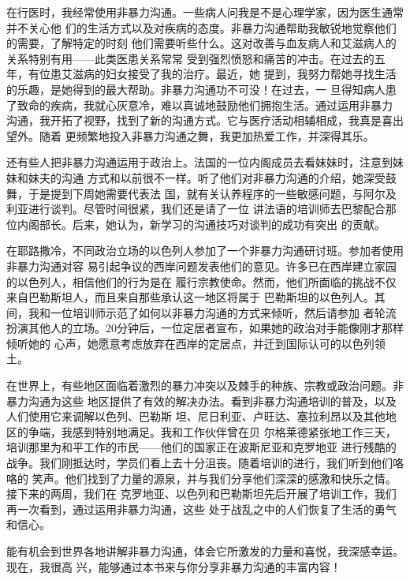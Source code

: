 \documentclass{ctexart}
\renewenvironment{quotation}{\setlength{\parskip}{0.5em}\setstretch{1.5}\kaishu\zihao{-5}\setlength{\parindent}{1em}}{\vspace{1em}}
\newcommand{\person}[1]{%
\nopagebreak{\raggedleft\small ------#1\par}}
\begin{document}
\begin{quotation}
	在行医时，我经常使用非暴力沟通。一些病人问我是不是心理学家，因为医生通常并不关心他
	们的生活方式以及对疾病的态度。非暴力沟通帮助我敏锐地觉察他们的需要，了解特定的时刻
	他们需要听些什么。这对改善与血友病人和艾滋病人的关系特别有用------此类医患关系常常
	受到强烈愤怒和痛苦的冲击。在过去的五年，有位患艾滋病的妇女接受了我的治疗。最近，她
	提到，我努力帮她寻找生活的乐趣，是她得到的最大帮助。非暴力沟通功不可没！在过去，一
	旦得知病人患了致命的疾病，我就心灰意冷，难以真诚地鼓励他们拥抱生活。通过运用非暴力
	沟通，我开拓了视野，找到了新的沟通方式。它与医疗活动相辅相成，我真是喜出望外。随着
	更频繁地投入非暴力沟通之舞，我更加热爱工作，并深得其乐。

	\person{------巴黎的一位医生}
\end{quotation}

还有些人把非暴力沟通运用于政治上。法国的一位内阁成员去看妹妹时，注意到妹妹和妹夫的沟通
方式和以前很不一样。听了他们对非暴力沟通的介绍，她深受鼓舞，于是提到下周她需要代表法
国，就有关认养程序的一些敏感问题，与阿尔及利亚进行谈判。尽管时间很紧，我们还是请了一位
讲法语的培训师去巴黎配合那位内阁部长。后来，她认为，新学习的沟通技巧对谈判的成功有突出
的贡献。

在耶路撒冷，不同政治立场的以色列人参加了一个非暴力沟通研讨班。参加者使用非暴力沟通对容
易引起争议的西岸问题发表他们的意见。许多已在西岸建立家园的以色列人，相信他们的行为是在
履行宗教使命。然而，他们所面临的挑战不仅来自巴勒斯坦人，而且来自那些承认这一地区将属于
巴勒斯坦的以色列人。其间，我和一位培训师示范了如何以非暴力沟通的方式来倾听，然后请参加
者轮流扮演其他人的立场。20分钟后，一位定居者宣布，如果她的政治对手能像刚才那样倾听她的
心声，她愿意考虑放弃在西岸的定居点，并迁到国际认可的以色列领土。

在世界上，有些地区面临着激烈的暴力冲突以及棘手的种族、宗教或政治问题。非暴力沟通为这些
地区提供了有效的解决办法。看到非暴力沟通培训的普及，以及人们使用它来调解以色列、巴勒斯
坦、尼日利亚、卢旺达、塞拉利昂以及其他地区的争端，我感到特别地满足。我和工作伙伴曾在贝
尔格莱德紧张地工作三天，培训那里为和平工作的市民------他们的国家正在波斯尼亚和克罗地亚
进行残酷的战争。我们刚抵达时，学员们看上去十分沮丧。随着培训的进行，我们听到他们咯咯的
笑声。他们找到了力量的源泉，并与我们分享他们深深的感激和快乐之情。接下来的两周，我们在
克罗地亚、以色列和巴勒斯坦先后开展了培训工作，我们再一次看到，通过运用非暴力沟通，这些
处于战乱之中的人们恢复了生活的勇气和信心。

能有机会到世界各地讲解非暴力沟通，体会它所激发的力量和喜悦，我深感幸运。现在，我很高
兴，能够通过本书来与你分享非暴力沟通的丰富内容！
\end{document}
